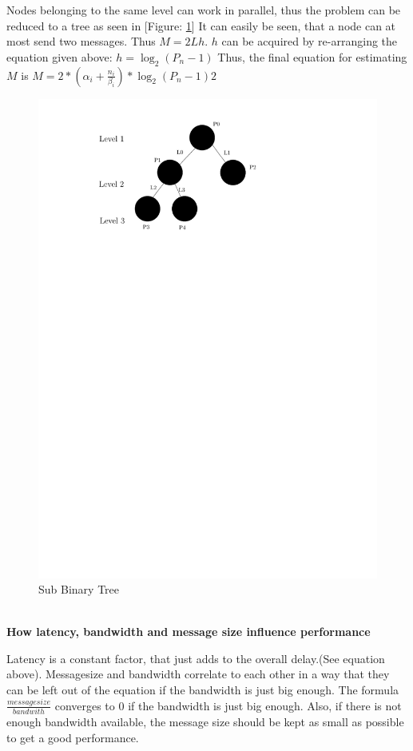 \documentclass[a4paper,twoside,11pt]{article}
\begin{document}
Nodes belonging to the same level can work in parallel, thus the problem can be reduced to a tree as seen in [Figure: \ref{SubBinTree}]
It can easily be seen, that a node can at most send two messages. Thus $M = 2Lh$.
$h$ can be acquired by re-arranging the equation given above: $h=\log_2 (P_n-1)$
Thus, the final equation for estimating $M$ is $M= 2*(\alpha_i + \frac{n_i}{\beta_i}) * \log_2 (P_n-1)2$

\begin{figure}[!htbp]
    \begin{center}
        \includegraphics[scale=1]{3c_2.pdf}
    \end{center}
    \caption{Sub Binary Tree}
    \label{SubBinTree}
\end{figure}
$ $ \\
\textbf{How latency, bandwidth and message size influence performance}

\hspace{1em}Latency is a constant factor, that just adds to the overall delay.(See equation above). Messagesize and bandwidth correlate to each other in a way that they can be left out of the equation if the bandwidth is just big enough.
The formula $\frac{messagesize}{bandwith}$ converges to 0 if the bandwidth is just big enough. Also, if there is not enough bandwidth available, the message size should be kept as small as possible to get a good performance.
\end{document}
